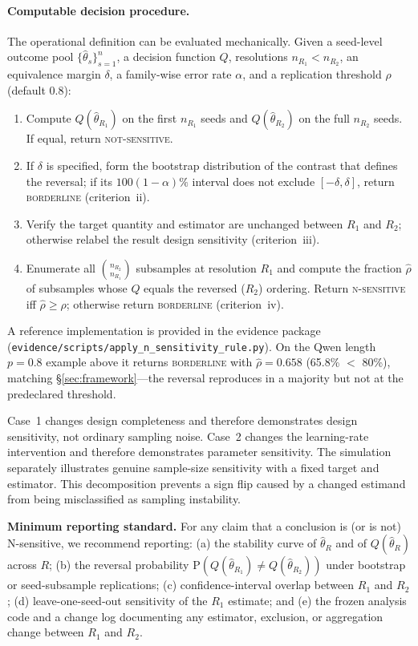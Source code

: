 \documentclass[11pt]{article}
\begin{document}
\paragraph{Computable decision procedure.}
The operational definition can be evaluated mechanically. Given a seed-level outcome pool $\{\hat\theta_{s}\}_{s=1}^{n}$, a decision function $Q$, resolutions $n_{R_1}<n_{R_2}$, an equivalence margin $\delta$, a family-wise error rate $\alpha$, and a replication threshold $\rho$ (default $0.8$):
\begin{enumerate}
  \item Compute $Q(\hat\theta_{R_1})$ on the first $n_{R_1}$ seeds and $Q(\hat\theta_{R_2})$ on the full $n_{R_2}$ seeds. If equal, return \textsc{not-sensitive}.
  \item If $\delta$ is specified, form the bootstrap distribution of the contrast that defines the reversal; if its $100(1-\alpha)\%$ interval does not exclude $[-\delta,\delta]$, return \textsc{borderline} (criterion~ii).
  \item Verify the target quantity and estimator are unchanged between $R_1$ and $R_2$; otherwise relabel the result design sensitivity (criterion~iii).
  \item Enumerate all $\binom{n_{R_2}}{n_{R_1}}$ subsamples at resolution $R_1$ and compute the fraction $\hat\rho$ of subsamples whose $Q$ equals the reversed ($R_2$) ordering. Return \textsc{n-sensitive} iff $\hat\rho \geq \rho$; otherwise return \textsc{borderline} (criterion~iv).
\end{enumerate}
A reference implementation is provided in the evidence package (\texttt{evidence/scripts/apply\_n\_sensitivity\_rule.py}). On the Qwen length $p{=}0.8$ example above it returns \textsc{borderline} with $\hat\rho{=}0.658$ (65.8\% $<$ 80\%), matching \S\ref{sec:framework}---the reversal reproduces in a majority but not at the predeclared threshold.

Case~1 changes design completeness and therefore demonstrates design sensitivity, not ordinary sampling noise. Case~2 changes the learning-rate intervention and therefore demonstrates parameter sensitivity. The simulation separately illustrates genuine sample-size sensitivity with a fixed target and estimator. This decomposition prevents a sign flip caused by a changed estimand from being misclassified as sampling instability.

\textbf{Minimum reporting standard.} For any claim that a conclusion is (or is not) N-sensitive, we recommend reporting: (a) the stability curve of $\hat{\theta}_R$ and of $Q(\hat{\theta}_R)$ across $R$; (b) the reversal probability $\mathrm{P}(Q(\hat{\theta}_{R_1}) \neq Q(\hat{\theta}_{R_2}))$ under bootstrap or seed-subsample replications; (c) confidence-interval overlap between $R_1$ and $R_2$; (d) leave-one-seed-out sensitivity of the $R_1$ estimate; and (e) the frozen analysis code and a change log documenting any estimator, exclusion, or aggregation change between $R_1$ and $R_2$.
\end{document}
